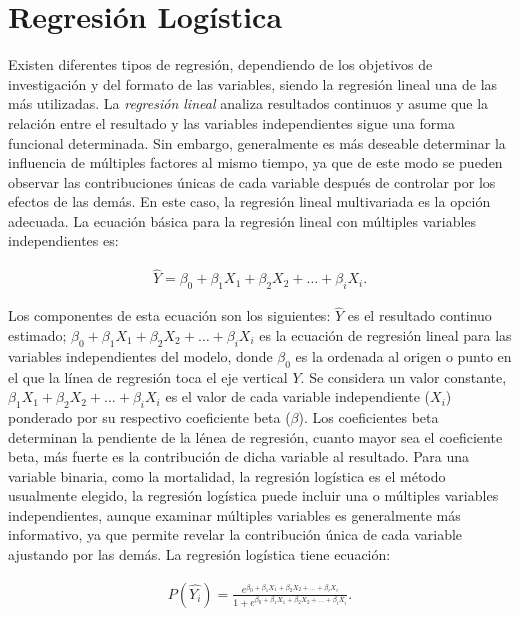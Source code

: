 \documentclass[12pt]{article}
\begin{document}
\section{Regresi\'on Log\'istica}
Existen diferentes tipos de regresi\'on, dependiendo de los objetivos de investigaci\'on y del formato de las variables, siendo la regresi\'on lineal una de las m\'as utilizadas. La \textit{regresi\'on lineal} analiza resultados continuos y asume que la relaci\'on entre el resultado y las variables independientes sigue una forma funcional determinada. Sin embargo, generalmente es m\'as deseable determinar la influencia de m\'ultiples factores al mismo tiempo, ya que de este modo se pueden observar las contribuciones \'unicas de cada variable despu\'es de controlar por los efectos de las dem\'as. En este caso, la regresi\'on lineal multivariada es la opci\'on adecuada. La ecuaci\'on b\'asica para la regresi\'on lineal con m\'ultiples variables independientes es:

\begin{eqnarray}
\hat{Y} = \beta_0 + \beta_1 X_1 + \beta_2 X_2 + \ldots + \beta_i X_i.
\end{eqnarray}

Los componentes de esta ecuaci\'on son los siguientes: $\hat{Y}$ es el resultado continuo estimado; $\beta_0 + \beta_1 X_1 + \beta_2 X_2 + \ldots + \beta_i X_i$ es la ecuaci\'on de regresi\'on lineal para las variables independientes del modelo, donde $\beta_0$ es la ordenada al origen o punto en el que la l\'inea de regresi\'on toca el eje vertical $Y$. Se considera un valor constante, $\beta_1 X_1 + \beta_2 X_2 + \ldots + \beta_i X_i$ es el valor de cada variable independiente ($X_i$) ponderado por su respectivo coeficiente beta ($\beta$). Los coeficientes beta determinan la pendiente de la l\'enea de regresi\'on, cuanto mayor sea el coeficiente beta, m\'as fuerte es la contribuci\'on de dicha variable al resultado. Para una variable binaria, como la mortalidad, la regresi\'on log\'istica es el m\'etodo usualmente elegido, la regresi\'on log\'istica puede incluir una o m\'ultiples variables independientes, aunque examinar m\'ultiples variables es generalmente m\'as informativo, ya que permite revelar la contribuci\'on \'unica de cada variable ajustando por las dem\'as. La regresi\'on log\'istica tiene ecuaci\'on:

\begin{eqnarray}
P(\hat{Y_i}) = \frac{e^{\beta_0 + \beta_1 X_1 + \beta_2 X_2 + \ldots + \beta_i X_i}}{1 + e^{\beta_0 + \beta_1 X_1 + \beta_2 X_2 + \ldots + \beta_i X_i}}.
\end{eqnarray}
\end{document}
